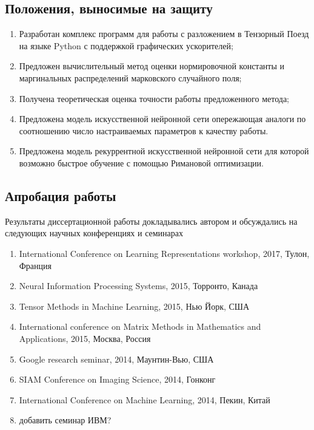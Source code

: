\subsection{Положения, выносимые на защиту} \label{sec:intro-defended-topics}
\begin{enumerate}
	\item Разработан комплекс программ для работы с разложением в Тензорный Поезд на языке Python с поддержкой графических ускорителей;
	\item Предложен вычислительный метод оценки нормировочной константы и маргинальных распределений марковского случайного поля;
	\item Получена теоретическая оценка точности работы предложенного метода;
	\item Предложена модель искусственной нейронной сети опережающая аналоги по соотношению число настраиваемых параметров к качеству работы.
	\item Предложена модель рекуррентной искусственной нейронной сети для которой возможно быстрое обучение с помощью Римановой оптимизации.
\end{enumerate}
\subsection{Апробация работы} \label{sec:intro-talks}
Результаты диссертационной работы докладывались автором и обсуждались на следующих научных конференциях и семинарах
\begin{enumerate}
	\item International Conference on Learning Representations workshop, 2017, Тулон, Франция
	\item Neural Information Processing Systems, 2015, Торронто, Канада
	\item Tensor Methods in Machine Learning, 2015, Нью Йорк, США
	\item International conference on Matrix Methods in Mathematics and Applications, 2015, Москва, Россия
	\item Google research seminar, 2014, Маунтин-Вью, США
	\item SIAM Conference on Imaging Science, 2014, Гонконг
	\item International Conference on Machine Learning, 2014, Пекин, Китай
	\item \alert{добавить семинар ИВМ?}
\end{enumerate}
